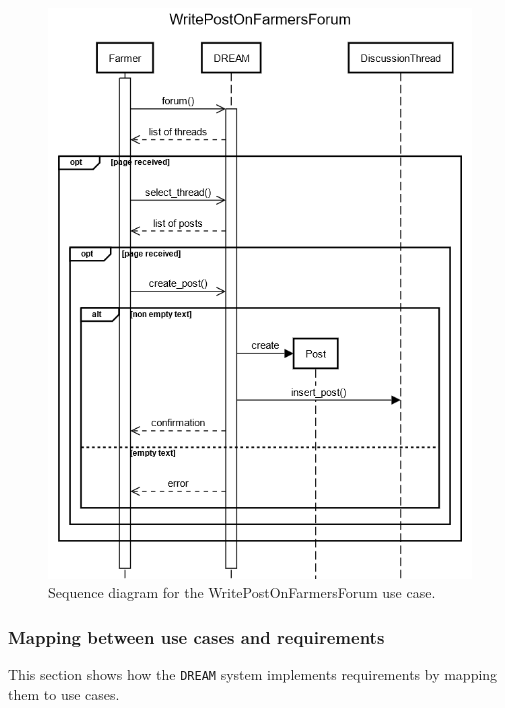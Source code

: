 \documentclass{article}
\begin{document}
\begin{figure}[H]
    \centering
	\includegraphics[scale=0.5]{sequence_diagrams/WritePostOnFarmersForum.png}
    \caption{Sequence diagram for the WritePostOnFarmersForum use case.}
\end{figure}
\newpage
\raggedright



\subsubsection{Mapping between use cases and requirements}
This section shows how the \verb|DREAM| system implements requirements by mapping them to use cases.
\end{document}
